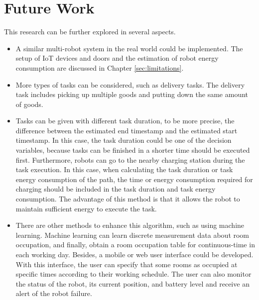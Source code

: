 \section{Future Work}
This research can be further explored in several aspects. 
\begin{itemize}
	\item A similar multi-robot system in the real world could be implemented. The setup of IoT devices and doors and the estimation of robot energy consumption are discussed in Chapter \ref{sec:limitations}. 
	\item More types of tasks can be considered, such as delivery tasks. The delivery task includes picking up multiple goods and putting down the same amount of goods. 
	\item Tasks can be given with different task duration, to be more precise, the difference between the estimated end timestamp and the estimated start timestamp. In this case, the task duration could be one of the decision variables, because tasks can be finished in a shorter time should be executed first. Furthermore, robots can go to the nearby charging station during the task execution. In this case, when calculating the task duration or task energy consumption of the path, the time or energy consumption required for charging should be included in the task duration and task energy consumption. The advantage of this method is that it allows the robot to maintain sufficient energy to execute the task. 
	\item There are other methods to enhance this algorithm, such as using machine learning. Machine learning can learn discrete measurement data about room occupation, and finally, obtain a room occupation table for continuous-time in each working day. Besides, a mobile or web user interface could be developed. With this interface, the user can specify that some rooms as occupied at specific times according to their working schedule. The user can also monitor the status of the robot, its current position, and battery level and receive an alert of the robot failure.
\end{itemize}


